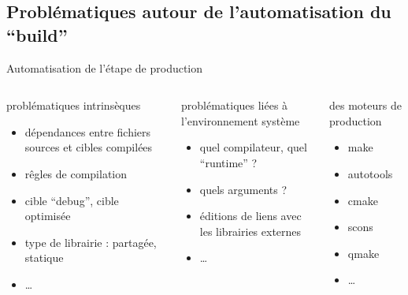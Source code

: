 \documentclass[9pt]{beamer}
\begin{document}
\subsection{Problématiques autour de l'automatisation du ``build''}
\begin{frame}{Automatisation de l'étape de production}
\begin{columns}[t]
\begin{block}{problématiques intrinsèques}
  \begin{itemize}
  \item dépendances entre fichiers sources et cibles compilées
  \item rêgles de compilation
  \item cible ``debug'', cible optimisée
  \item type de librairie : partagée, statique
  \item \dots
  \end{itemize}
\end{block}
\begin{block}{problématiques liées à l'environnement système}
  \begin{itemize}
  \item quel compilateur, quel ``runtime'' ?
  \item quels arguments ?
  \item éditions de liens avec les librairies externes
  \item \dots
  \end{itemize}
\end{block}
\begin{block}{des moteurs de production}
  \begin{itemize}
  \item make
  \item autotools
  \item cmake
  \item scons
  \item qmake
  \item \dots
  \end{itemize}
\end{block}
\end{columns}

\end{frame}
\end{document}
